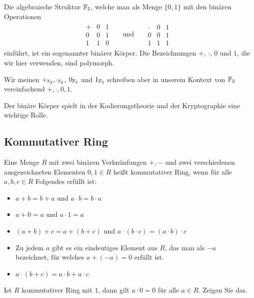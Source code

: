 \begin{bsp} 
	Die algebraische Struktur $\mathbb{F}_2$, welche man als Menge  $\{0,1\}$ mit den binären Operationen 
\begin{align*}
\begin{array}{c|cc}
	+ & 0 & 1 \\
	\hline 
	0 & 0 & 1 \\
	1 & 1 & 0
\end{array}
& & \text{und} & & 
\begin{array}{c|cc}
\cdot & 0 & 1 \\
\hline 
0 & 0 & 1 \\
1 & 1 & 1
\end{array}
\end{align*} 
einführt, ist ein sogenannter binärer Körper. Die Bezeichnungen $+$, $\cdot$, $0$ und $1$, die wir hier verwenden, sind polymorph. 

Wir meinen $+_{\mathbb{F}_2}, \cdot_{\mathbb{F}_2}$, $0_{\mathbb{F}_2}$ und $1_{\mathbb{F}_2}$ schreiben aber in unserem Kontext von $\mathbb{F}_2$ vereinfachend $+, \cdot, 0, 1$. 

Der binäre Körper spielt in der Kodierungstheorie und der Kryptographie eine wichtige Rolle. 

\end{bsp} 


\subsection{Kommutativer Ring} 

\begin{defn}
	Eine Menge $R$ mit zwei binären Verknünfungen $+, -$ und zwei verschiedenen ausgezeichneten Elementen $0, 1 \in R$ heißt kommutativer Ring, wenn für alle $a,b,c \in R$ Folgendes erfüllt ist: 
	\begin{itemize}
		\item $a + b =b +a$ und $a \cdot b = b \cdot a$ 
		\item $a + 0 = a$ und $a \cdot 1 = a$ 
		\item $(a+b)+c = a+(b+c)$ und $a \cdot (b \cdot c) = (a \cdot b) \cdot c$
		\item Zu jedem $a$ gibt es ein eindeutiges Element aus $R$, das man als $-a$ bezeichnet, für welches $a+(-a)=0$ erfüllt ist. 
		\item $a \cdot (b+c) = a \cdot b + a \cdot c$
	\end{itemize} 
\end{defn}

\begin{aufg} 
	Ist $R$ kommutativer Ring mit $1$, dann gilt $a \cdot 0=0$ für alle $a \in R$. Zeigen Sie das. 
\end{aufg} 

